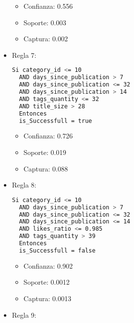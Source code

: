 \begin{itemize}
    \begin{itemize}
      \item Confianza: 0.556
      \item Soporte: 0.003
      \item Captura: 0.002
    \end{itemize}

  \item Regla 7:

\begin{lstlisting}[language=bash, numbers=none]
  Si category_id <= 10
  AND days_since_publication > 7
  AND days_since_publication <= 32
  AND days_since_publication > 14
  AND tags_quantity <= 32
  AND title_size > 28
  Entonces
  is_Successfull = true
\end{lstlisting}

    \begin{itemize}
      \item Confianza: 0.726
      \item Soporte: 0.019
      \item Captura: 0.088
    \end{itemize}

  \item Regla 8:

\begin{lstlisting}[language=bash, numbers=none]
  Si category_id <= 10
  AND days_since_publication > 7
  AND days_since_publication <= 32
  AND days_since_publication <= 14
  AND likes_ratio <= 0.985
  AND tags_quantity > 39
  Entonces
  is_Successfull = false

\end{lstlisting}

    \begin{itemize}
      \item Confianza: 0.902
      \item Soporte: 0.0012
      \item Captura: 0.0013
    \end{itemize}

  \item Regla 9:


\end{itemize}
